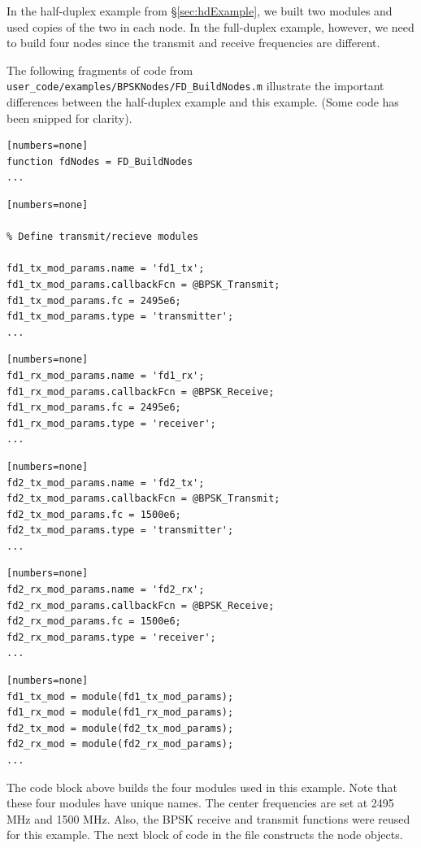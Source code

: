 In the half-duplex example from \S\ref{sec:hdExample}, we built two
modules and used copies of the two in each node. In the full-duplex
example, however, we need to build four nodes since the transmit and
receive frequencies are different.

The following fragments of code from
\verb+user_code/examples/BPSKNodes/FD_BuildNodes.m+ illustrate the important
differences between the half-duplex example and this example.  (Some
code has been snipped for clarity).

\begin{lstlisting}[name=fdBuildNodes][numbers=none]
function fdNodes = FD_BuildNodes
...
\end{lstlisting}
\begin{lstlisting}[name=fdBuildNodes, firstnumber=22][numbers=none]

% Define transmit/recieve modules

fd1_tx_mod_params.name = 'fd1_tx';
fd1_tx_mod_params.callbackFcn = @BPSK_Transmit;
fd1_tx_mod_params.fc = 2495e6;
fd1_tx_mod_params.type = 'transmitter';
...
\end{lstlisting}
\begin{lstlisting}[name=fdBuildNodes, firstnumber=40][numbers=none]
fd1_rx_mod_params.name = 'fd1_rx';
fd1_rx_mod_params.callbackFcn = @BPSK_Receive;
fd1_rx_mod_params.fc = 2495e6;
fd1_rx_mod_params.type = 'receiver';
...
\end{lstlisting}
\begin{lstlisting}[name=fdBuildNodes, firstnumber=56][numbers=none]
fd2_tx_mod_params.name = 'fd2_tx';
fd2_tx_mod_params.callbackFcn = @BPSK_Transmit;
fd2_tx_mod_params.fc = 1500e6;
fd2_tx_mod_params.type = 'transmitter';
...
\end{lstlisting}
\begin{lstlisting}[name=fdBuildNodes, firstnumber=71][numbers=none]
fd2_rx_mod_params.name = 'fd2_rx';
fd2_rx_mod_params.callbackFcn = @BPSK_Receive;
fd2_rx_mod_params.fc = 1500e6;
fd2_rx_mod_params.type = 'receiver';
...
\end{lstlisting}
\begin{lstlisting}[name=fdBuildNodes, firstnumber=87][numbers=none]
fd1_tx_mod = module(fd1_tx_mod_params);
fd1_rx_mod = module(fd1_rx_mod_params);
fd2_tx_mod = module(fd2_tx_mod_params);
fd2_rx_mod = module(fd2_rx_mod_params);
...
\end{lstlisting}

The code block above builds the four modules used in this example.
Note that these four modules have unique names.  The center
frequencies are set at 2495 MHz and 1500 MHz.  Also, the BPSK
receive and transmit functions were reused for this example.  The
next block of code in the file constructs the node objects.

